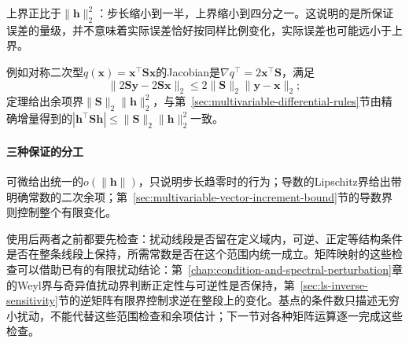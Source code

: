 上界正比于$\lVert\bm h\rVert_2^2$：步长缩小到一半，上界缩小到四分之一。这说明的是所保证误差的量级，并不意味着实际误差恰好按同样比例变化，实际误差也可能远小于上界。

例如对称二次型$q(\bm x)=\bm x^\top\bm S\bm x$的Jacobian是$\nabla q^\top=2\bm x^\top\bm S$，满足
\[
 \lVert2\bm S\bm y-2\bm S\bm x\rVert_2\leq2\lVert\bm S\rVert_2\lVert\bm y-\bm x\rVert_2 ;
\]
定理给出余项界$\lVert\bm S\rVert_2\lVert\bm h\rVert_2^2$，与第~\ref{sec:multivariable-differential-rules}节由精确增量得到的$|\bm h^\top\bm S\bm h|\leq\lVert\bm S\rVert_2\lVert\bm h\rVert_2^2$一致。

\paragraph{三种保证的分工}
可微给出统一的$o(\lVert\bm h\rVert)$，只说明步长趋零时的行为；导数的Lipschitz界给出带明确常数的二次余项；第~\ref{sec:multivariable-vector-increment-bound}节的导数界则控制整个有限变化。

使用后两者之前都要先检查：扰动线段是否留在定义域内，可逆、正定等结构条件是否在整条线段上保持，所需常数是否在这个范围内统一成立。矩阵映射的这些检查可以借助已有的有限扰动结论：第~\ref{chap:condition-and-spectral-perturbation}章的Weyl界与奇异值扰动界判断正定性与可逆性是否保持，第~\ref{sec:ls-inverse-sensitivity}节的逆矩阵有限界控制求逆在整段上的变化。基点的条件数只描述无穷小扰动，不能代替这些范围检查和余项估计；下一节对各种矩阵运算逐一完成这些检查。
